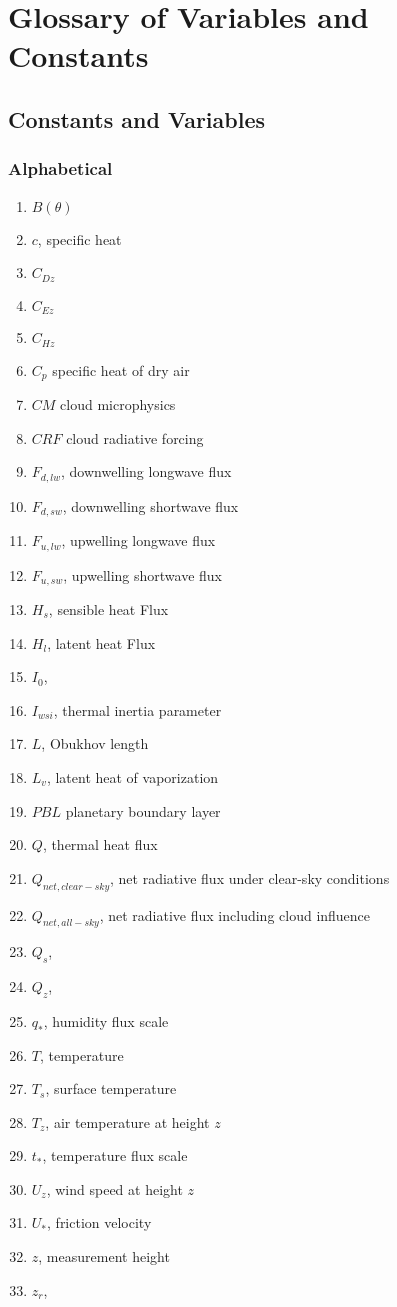 \chapter{Glossary of Variables and Constants}
\section{Constants and Variables}
\subsection{Alphabetical}

\begin{enumerate}
    \item[]$B(\theta)$
    \item[]$c$, specific heat
    \item[]$C_{Dz}$
    \item[]$C_{Ez}$
    \item[]$C_{Hz}$ 
    \item[]$C_{p}$ specific heat of dry air
    \item[]$CM$ cloud microphysics
    \item[]$CRF$ cloud radiative forcing
    \item[]$F_{d,lw}$, downwelling longwave flux
    \item[]$F_{d,sw}$, downwelling shortwave flux
    \item[]$F_{u,lw}$, upwelling longwave flux
    \item[]$F_{u,sw}$, upwelling shortwave flux
    \item[]$H_{s}$, sensible heat Flux
    \item[]$H_{l}$, latent heat Flux
    \item[]$I_{0}$,
    \item[]$I_{wsi}$, thermal inertia parameter
    \item[]$L$, Obukhov length
    \item[]$L_{v}$, latent heat of vaporization
    \item[]$PBL$ planetary boundary layer
    \item[]$Q$, thermal heat flux
    \item[]$Q_{net, clear-sky}$, net radiative flux under clear-sky conditions
    \item[]$Q_{net, all-sky}$, net radiative flux including cloud influence
    \item[]$Q_{s}$,
    \item[]$Q_{z}$,
    \item[]$q_{*}$, humidity flux scale
    \item[]$T$, temperature
    \item[]$T_{s}$, surface temperature
    \item[]$T_{z}$, air temperature at height $z$
    \item[]$t_{*}$, temperature flux scale
    \item[]$U_{z}$, wind speed at height $z$
    \item[]$U_{*}$, friction velocity
    \item[]$z$, measurement height
    \item[]$z_{r}$,
\end{enumerate}

